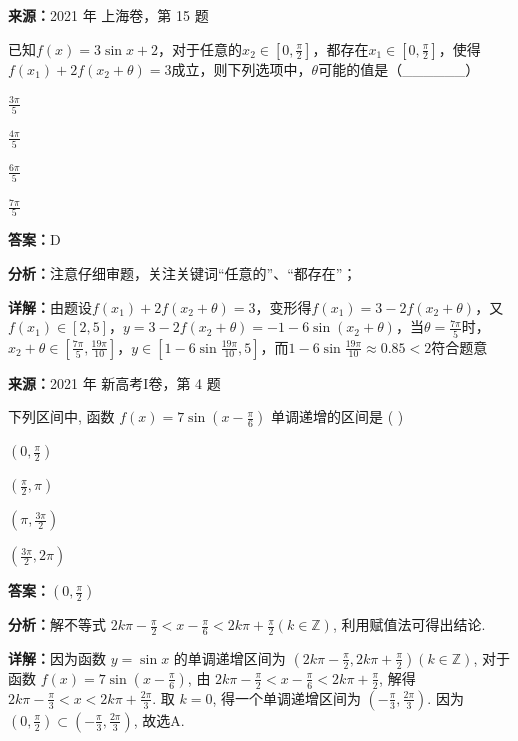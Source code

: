 \begin{question}[points=5]
\textbf{来源：}2021 年 上海卷，第 15 题\par
已知$f(x)=3\sin x+2$，对于任意的$x_2\in[0,\frac{\pi}{2}]$，都存在$x_1\in[0,\frac{\pi}{2}]$，使得$f(x_1)+2f(x_2+\theta)=3$成立，则下列选项中，$\theta$可能的值是（\_\_\_\_\_\_）
\begin{choices}
  \item $\frac{3\pi}{5}$
  \item $\frac{4\pi}{5}$
  \item $\frac{6\pi}{5}$
  \item $\frac{7\pi}{5}$
\end{choices}
\begin{solution}
\textbf{答案：}D

\textbf{分析：}注意仔细审题，关注关键词“任意的”、“都存在”；

\textbf{详解：}由题设$f(x_1)+2f(x_2+\theta)=3$，变形得$f(x_1)=3-2f(x_2+\theta)$，又$f(x_1)\in[2,5]$，$y=3-2f(x_2+\theta)=-1-6\sin(x_2+\theta)$，当$\theta=\frac{7\pi}{5}$时，$x_2+\theta\in[\frac{7\pi}{5},\frac{19\pi}{10}]$，$y\in[1-6\sin\frac{19\pi}{10},5]$，而$1-6\sin\frac{19\pi}{10}\approx0.85<2$符合题意
\end{solution}
\end{question}

\begin{question}[points=5]
\textbf{来源：}2021 年 新高考I卷，第 4 题\par
下列区间中, 函数 $f(x) = 7\sin\left(x - \frac{\pi}{6}\right)$ 单调递增的区间是 ( )
\begin{choices}
  \item $\left(0, \frac{\pi}{2}\right)$
  \item $\left(\frac{\pi}{2}, \pi\right)$
  \item $\left(\pi, \frac{3\pi}{2}\right)$
  \item $\left(\frac{3\pi}{2}, 2\pi\right)$
\end{choices}
\begin{solution}
\textbf{答案：}$\left(0, \frac{\pi}{2}\right)$

\textbf{分析：}解不等式 $2k\pi - \frac{\pi}{2} < x - \frac{\pi}{6} < 2k\pi + \frac{\pi}{2} (k \in \mathbb{Z})$, 利用赋值法可得出结论.

\textbf{详解：}因为函数 $y = \sin x$ 的单调递增区间为 $\left(2k\pi - \frac{\pi}{2}, 2k\pi + \frac{\pi}{2}\right) (k \in \mathbb{Z})$, 对于函数 $f(x) = 7\sin\left(x - \frac{\pi}{6}\right)$, 由 $2k\pi - \frac{\pi}{2} < x - \frac{\pi}{6} < 2k\pi + \frac{\pi}{2}$, 解得 $2k\pi - \frac{\pi}{3} < x < 2k\pi + \frac{2\pi}{3}$. 取 $k=0$, 得一个单调递增区间为 $\left(-\frac{\pi}{3}, \frac{2\pi}{3}\right)$. 因为 $\left(0, \frac{\pi}{2}\right) \subset \left(-\frac{\pi}{3}, \frac{2\pi}{3}\right)$, 故选A.
\end{solution}
\end{question}

